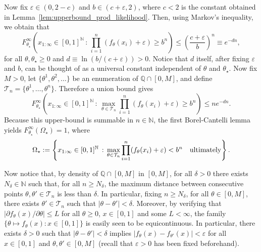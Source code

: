 \documentclass[11pt,twoside]{article}
\def\NN{\mathbb{N}}
\def\QQ{\mathbb{Q}}
\begin{document}
Now fix $\varepsilon\in(0, 2-c)$ and $b\in (c+\varepsilon, 2)$, where $c<2$ is the constant obtained in Lemma~\ref{lem:upperbound_prod_likelihood}. Then, using Markov's inequality, we obtain that
%
\begin{equation}\label{eq:bound_single_theta}
    F_{\theta_\star}^\infty \left(x_{1:\infty}\in [0,1]^\NN\, :\,  \prod_{i=1}^n (f_\theta(x_i)+\varepsilon) \geq b^n\right) \leq \left(\frac{c+\varepsilon}{b}\right)^n \equiv e^{-dn},
\end{equation}
%
for all $\theta, \theta_\star\geq 0$ and $d\equiv\ln(b/(c+\varepsilon))>0$. Notice that $d$ itself, after fixing $\varepsilon$ and $b$, can be thought of as a universal constant independent of $\theta$ and $\theta_\star$. Now fix $M>0$, let $\{\theta^1, \theta^2, \dots\}$ be an enumeration of $\QQ\cap[0,M]$, and define $\mathcal T_n = \{\theta^1, \dots, \theta^n\}$. Therefore a union bound gives
%
\begin{equation*}
    F_{\theta_\star}^\infty \left(x_{1:\infty}\in [0,1]^\NN\, :\,  \max_{\theta\in\mathcal T_n}\prod_{i=1}^n (f_\theta(x_i)+\varepsilon) \geq b^n\right) \leq n e^{-dn}.
\end{equation*}
%
Because this upper-bound is summable in $n\in\NN$, the first Borel-Cantelli lemma yields $F_{\theta_\star}^\infty (\Omega_\star) = 1$, where
%
\begin{equation*}
    \Omega_\star := \left\{x_{1:\infty}\in[0,1]^\NN\, :\,  \max_{\theta\in\mathcal T_n}\prod_{i=1}^n (f_\theta(x_i)+\varepsilon) < b^n \quad \textnormal{ultimately}\right\}.
\end{equation*}


Now notice that, by density of $\QQ\cap[0,M]$ in $[0,M]$, for all $\delta>0$ there exists $N_\delta\in\NN$ such that, for all $n\geq N_\delta$, the maximum distance between consecutive points $\theta,\theta'\in\mathcal T_n$ is less than $\delta$. In particular, fixing $n\geq N_\delta$, for all $\theta\in[0,M]$, there exists $\theta'\in\mathcal T_n$ such that $|\theta - \theta'|< \delta$. Moreover, by verifying that $|\partial f_\theta(x)/\partial \theta|\leq L$ for all $\theta\geq 0$, $x\in[0,1]$ and some $L<\infty$, the family $\{\theta\mapsto f_\theta(x) : x\in[0,1]\}$ is easily seen to be equicontinuous. In particular, there exists $\delta>0$ such that $|\theta - \theta'|<\delta$ implies $|f_\theta(x) - f_{\theta'}(x)|<\varepsilon$ for all $x\in[0,1]$ and $\theta,\theta'\in[0,M]$ (recall that $\varepsilon>0$ has been fixed beforehand).
\end{document}
